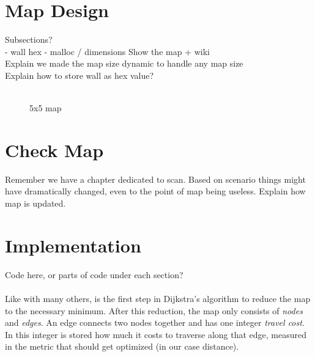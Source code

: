 \section{Map Design}
\label{sec:map_design} %
Subsections?\\
- wall hex
- malloc / dimensions
Show the map + wiki\\
Explain we made the map size dynamic to handle any map size\\
Explain how to store wall as hex value?\\
\\
\begin{figure}[htp]
    \centering
    \hspace{0.2\textwidth}
    \caption{5x5 map}
    \label{fig:5x5map}
\end{figure}

\section{Check Map}
\label{sec:map_check} %
Remember we have a chapter dedicated to scan.\linebreak
Based on scenario things might have dramatically changed, even to the point of map being useless. Explain how map is updated.

\section{Implementation}
\label{sec:map} %
Code here, or parts of code under each section?\\
\\
Like with many others,
is the first step in Dijkstra's algorithm to reduce the map to the necessary minimum.
After this reduction, the map only consists of \emph{nodes} and \emph{edges}.
An edge connects two nodes together and has one integer \emph{travel cost}.
In this integer is stored how much it costs to traverse along that edge,
measured in the metric that should get optimized (in our case distance).


